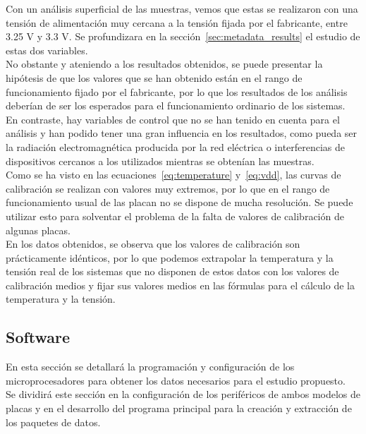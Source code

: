\documentclass[spanish]{template/minim}
\begin{document}
Con un análisis superficial de las muestras, vemos que estas se realizaron con una tensión de alimentación muy cercana a la tensión fijada por el fabricante, entre 3.25 V y 3.3 V. Se profundizara en la sección~\ref{sec:metadata_results} el estudio de estas dos variables.\\

No obstante y ateniendo a los resultados obtenidos, se puede presentar la hipótesis de que los valores que se han obtenido están en el rango de funcionamiento fijado por el fabricante, por lo que los resultados de los análisis deberían de ser los esperados para el funcionamiento ordinario de los sistemas.\\

En contraste, hay variables de control que no se han tenido en cuenta para el análisis y han podido tener una gran influencia en los resultados, como pueda ser la radiación electromagnética producida por la red eléctrica o interferencias de dispositivos cercanos a los utilizados mientras se obtenían las muestras.\\

Como se ha visto en las ecuaciones~\ref{eq:temperature} y~\ref{eq:vdd}, las curvas de calibración se realizan con valores muy extremos, por lo que en el rango de funcionamiento usual de las placan no se dispone de mucha resolución. Se puede utilizar esto para solventar el problema de la falta de valores de calibración de algunas placas.\\

En los datos obtenidos, se observa que los valores de calibración son prácticamente idénticos, por lo que podemos extrapolar la temperatura y la tensión real de los sistemas que no disponen de estos datos con los valores de calibración medios y fijar sus valores medios en las fórmulas para el cálculo de la temperatura y la tensión.


\subsection{Software}\label{sec:programming}

En esta sección se detallará la programación y configuración de los microprocesadores para obtener los datos necesarios para el estudio propuesto.\\

Se dividirá este sección en la configuración de los periféricos de ambos modelos de placas y en el desarrollo del programa principal para la creación y extracción de los paquetes de datos.
\end{document}

